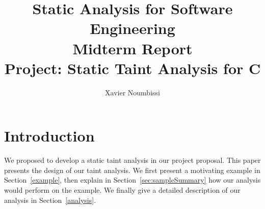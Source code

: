 \documentclass[10pt]{article}
\title{Static Analysis for Software Engineering\\
		Midterm Report \\
		Project: Static Taint Analysis for C}
\author{Xavier Noumbissi}
\date{}
\begin{document}
\maketitle

\section{Introduction}

We proposed to develop a static taint analysis in our
project proposal.
This paper presents the design of our taint analysis.
We first present a motivating example in Section~\ref{example},
then explain in Section~\ref{sec:sampleSummary} how our analysis
would perform on the example. We finally give a detailed
description of our analysis in Section~\ref{analysis}.







\end{document}
